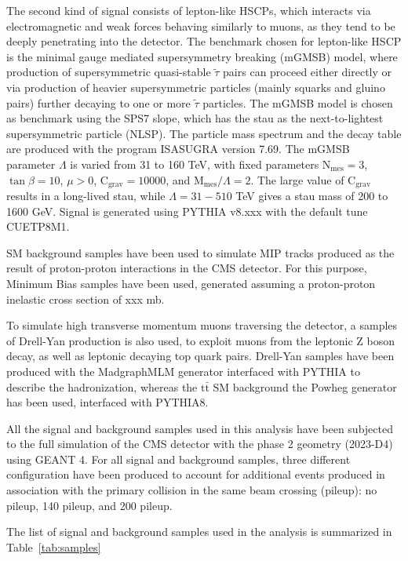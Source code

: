 \documentclass[11pt,oneside,a4paper]{article}
\begin{document}
The second kind of signal consists of lepton-like HSCPs, which interacts via electromagnetic and weak forces behaving similarly to muons, as they tend to be deeply penetrating into the detector.
The benchmark chosen for lepton-like HSCP is the minimal gauge mediated supersymmetry breaking (mGMSB) model, where production of supersymmetric quasi-stable $\tilde{\tau}$ pairs can proceed either directly or via production of heavier supersymmetric particles (mainly squarks and gluino pairs) further decaying to one or more $\tilde{\tau}$ particles.
The mGMSB model is chosen as benchmark using the SPS7 slope, which has the stau as the next-to-lightest supersymmetric particle (NLSP). 
The particle mass spectrum and the decay table are produced with the program ISASUGRA version 7.69. The mGMSB parameter $\Lambda$ is varied from 31 to
160 TeV, with fixed parameters $\mathrm{N}_{\mathrm{mes}} = 3$, $\tan \beta = 10$, $\mu > 0$, $\mathrm{C}_{\mathrm{grav}} = 10000$, and $\mathrm{M}_{\mathrm{mes}}/\Lambda = 2$. 
The large value of $\mathrm{C}_{\mathrm{grav}}$ results in a long-lived stau, while $\Lambda = 31-510$ TeV gives a stau mass of 200 to 1600 GeV. 
Signal is generated using PYTHIA v8.xxx with the default tune CUETP8M1.


SM background samples have been used to simulate MIP tracks produced as the result of proton-proton interactions in the CMS detector.
For this purpose, Minimum Bias samples have been used, generated assuming a proton-proton inelastic cross section of xxx mb.


To simulate high transverse momentum muons traversing the detector, a samples of Drell-Yan production is also used, to exploit muons from the leptonic Z boson decay, as well as leptonic decaying top quark pairs.
Drell-Yan samples have been produced with the MadgraphMLM generator interfaced with PYTHIA to describe the hadronization, whereas the $\mathrm{t}\bar{\mathrm{t}}$ SM background the Powheg generator has been used, interfaced with PYTHIA8.


All the signal and background samples used in this analysis have been subjected to the full simulation of the CMS detector with the phase 2 geometry (2023-D4) using GEANT 4. 
For all signal and background samples, three different configuration have been produced to account for additional events produced in association with the primary collision in the same beam crossing (pileup): no pileup, 140 pileup, and 200 pileup.


The list of signal and background samples used in the analysis is summarized in Table~\ref{tab:samples}
\end{document}
